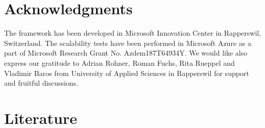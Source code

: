 \documentclass[3p,times]{elsarticle}
\begin{document}
\section{Acknowledgments}
\label{sec:ackn}

The framework has been developed in Microsoft Innovation Center in Rapperswil, Switzerland. The scalability tests have been performed in Microsoft Azure as a part of Microsoft Research Grant No. Azdem187T64934Y. We would like also express our gratitude to Adrian Rohner, Roman Fuchs, Rita Rueppel and Vladimir Baros from University of Applied Sciences in Rapperswil for support and fruitful discussions.

\section{Literature}
\label{sec:literature}



\end{document}
